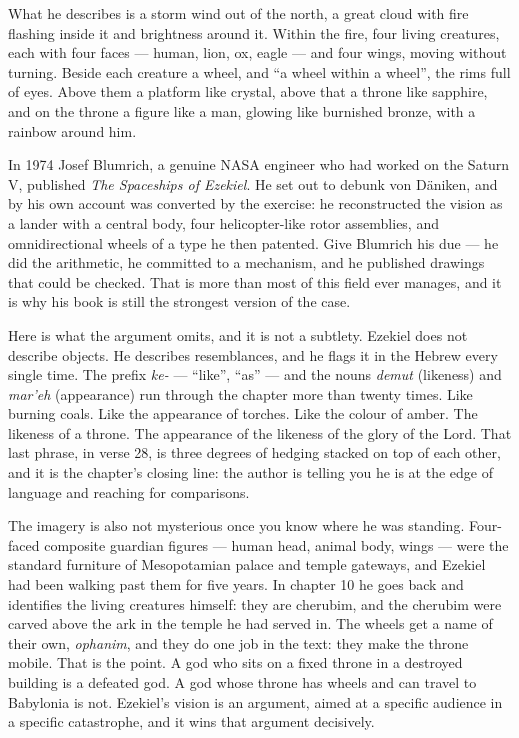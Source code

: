 What he describes is a storm wind out of the north, a great cloud with fire flashing inside it and
brightness around it. Within the fire, four living creatures, each with four faces --- human,
lion, ox, eagle --- and four wings, moving without turning. Beside each creature a wheel, and
``a wheel within a wheel'', the rims full of eyes. Above them a platform like crystal, above that a
throne like sapphire, and on the throne a figure like a man, glowing like burnished bronze, with a
rainbow around him.

In 1974 Josef Blumrich, a genuine NASA engineer who had worked on the Saturn V, published
\emph{The Spaceships of Ezekiel}. He set out to debunk von D\"aniken, and by his own account was
converted by the exercise: he reconstructed the vision as a lander with a central body, four
helicopter-like rotor assemblies, and omnidirectional wheels of a type he then patented. Give
Blumrich his due --- he did the arithmetic, he committed to a mechanism, and he published drawings
that could be checked. That is more than most of this field ever manages, and it is why his book
is still the strongest version of the case.

Here is what the argument omits, and it is not a subtlety. Ezekiel does not describe objects. He
describes resemblances, and he flags it in the Hebrew every single time. The prefix \emph{ke-} ---
``like'', ``as'' --- and the nouns \emph{demut} (likeness) and \emph{mar'eh} (appearance) run
through the chapter more than twenty times. Like burning coals. Like the appearance of torches.
Like the colour of amber. The likeness of a throne. The appearance of the likeness of the glory of
the Lord. That last phrase, in verse 28, is three degrees of hedging stacked on top of each other,
and it is the chapter's closing line: the author is telling you he is at the edge of language and
reaching for comparisons. 

The imagery is also not mysterious once you know where he was standing. Four-faced composite
guardian figures --- human head, animal body, wings --- were the standard furniture of
Mesopotamian palace and temple gateways, and Ezekiel had been walking past them for five years. In
chapter 10 he goes back and identifies the living creatures himself: they are cherubim, and the
cherubim were carved above the ark in the temple he had served in. The wheels get a name of their
own, \emph{ophanim}, and they do one job in the text: they make the throne mobile. That is the
point. A god who sits on a fixed throne in a destroyed building is a defeated god. A god whose
throne has wheels and can travel to Babylonia is not. Ezekiel's vision is an argument, aimed at a
specific audience in a specific catastrophe, and it wins that argument decisively.

